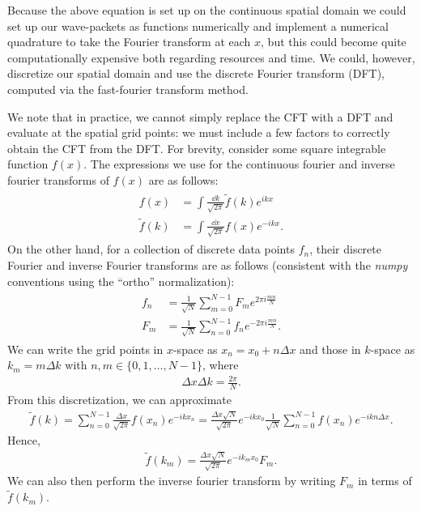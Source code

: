 Because the above equation is set up on the continuous spatial domain we could set up our wave-packets as functions numerically and implement a numerical quadrature to take the Fourier transform at each $x$, but this could become quite computationally expensive both regarding resources and time.
We could, however, discretize our spatial domain and use the discrete Fourier transform (DFT), computed via the fast-fourier transform method.

We note that in practice, we cannot simply replace the CFT with a DFT and evaluate at the spatial grid points: we must include a few factors to correctly obtain the CFT from the DFT.
For brevity, consider some square integrable function $f(x)$.
The expressions we use for the continuous fourier and inverse fourier transforms of $f(x)$ are as follows:
\begin{align}
\begin{aligned} 
    f(x) &= \int \frac{\dd{k}}{\sqrt{2 \pi}} \tilde{f}(k) e^{i k x} \\
    \tilde{f}(k) &= \int \frac{\dd{x}}{\sqrt{2 \pi}} f(x) e^{-ikx}
.\end{aligned}
\end{align}
On the other hand, for a collection of discrete data points $f_{n}$, their discrete Fourier and inverse Fourier transforms are as follows (consistent with the \textit{numpy} conventions using the ``ortho'' normalization):
\begin{align}
\begin{aligned} 
    f_{n} &= \frac{1}{\sqrt{N}} \sum_{m=0}^{N-1} F_{m} e^{2 \pi i \frac{m n}{N}} \\
    F_{m} &= \frac{1}{\sqrt{N}} \sum_{n=0}^{N-1} f_{n} e^{-2 \pi i \frac{m n}{N}}
.\end{aligned}
\end{align}
We can write the grid points in $x$-space as $x_{n} = x_0 + n \Delta x$ and those in $k$-space as $k_{m} = m \Delta k$ with $n,m \in \{ 0,1,\ldots,N-1 \}$, where
\begin{align}
    \Delta x \Delta k = \frac{2 \pi}{N}
.\end{align}
From this discretization, we can approximate
\begin{align}
    \tilde{f}(k) = \sum_{n=0}^{N-1} \frac{\Delta x}{\sqrt{2 \pi}} f(x_{n}) e^{-i k x_{n}} = \frac{\Delta x \sqrt{N}}{\sqrt{2 \pi}} e^{-i k x_0} \frac{1}{\sqrt{N}} \sum_{n=0}^{N-1} f(x_{n}) e^{-i k n \Delta x}
.\end{align}
Hence,
\begin{align}
    \tilde{f}(k_{m}) = \frac{\Delta x \sqrt{N}}{\sqrt{2 \pi}} e^{-i k_{m} x_0} F_{m}
.\end{align}
We can also then perform the inverse fourier transform by writing $F_{m}$ in terms of $\tilde{f}(k_{m})$.

